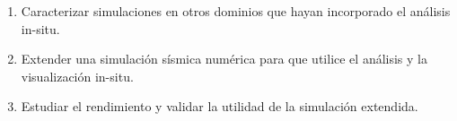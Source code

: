 \begin{enumerate}
  \item Caracterizar simulaciones en otros dominios que hayan incorporado el análisis in-situ. %
  \item Extender una simulación sísmica numérica para que utilice el análisis y la visualización in-situ. %
  \item Estudiar el rendimiento y validar la utilidad de la simulación extendida. %
\end{enumerate}